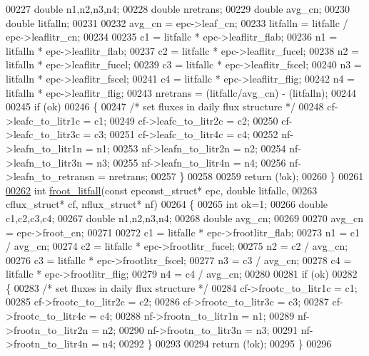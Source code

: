 \begin{DoxyCode}
00227     \textcolor{keywordtype}{double} n1,n2,n3,n4;
00228     \textcolor{keywordtype}{double} nretrans;
00229     \textcolor{keywordtype}{double} avg\_cn;
00230     \textcolor{keywordtype}{double} litfalln;
00231     
00232     avg\_cn = epc->leaf\_cn;
00233     litfalln = litfallc / epc->leaflitr\_cn;
00234     
00235     c1 = litfallc * epc->leaflitr\_flab;
00236     n1 = litfalln * epc->leaflitr\_flab;
00237     c2 = litfallc * epc->leaflitr\_fucel;
00238     n2 = litfalln * epc->leaflitr\_fucel; 
00239     c3 = litfallc * epc->leaflitr\_fscel;
00240     n3 = litfalln * epc->leaflitr\_fscel; 
00241     c4 = litfallc * epc->leaflitr\_flig;
00242     n4 = litfalln * epc->leaflitr\_flig; 
00243     nretrans = (litfallc/avg\_cn) - (litfalln);
00244     
00245     \textcolor{keywordflow}{if} (ok)
00246     \{
00247         \textcolor{comment}{/* set fluxes in daily flux structure */}
00248         cf->leafc\_to\_litr1c = c1;
00249         cf->leafc\_to\_litr2c = c2;
00250         cf->leafc\_to\_litr3c = c3;
00251         cf->leafc\_to\_litr4c = c4;
00252         nf->leafn\_to\_litr1n = n1;
00253         nf->leafn\_to\_litr2n = n2;
00254         nf->leafn\_to\_litr3n = n3;
00255         nf->leafn\_to\_litr4n = n4;
00256         nf->leafn\_to\_retransn = nretrans;
00257     \}
00258     
00259     \textcolor{keywordflow}{return} (!ok);
00260 \}
00261 
\hypertarget{phenology_8c_source_l00262}{}\hyperlink{phenology_8c_ac9d84f39b7db5a7498a0ac0f9edffd1f}{00262} \textcolor{keywordtype}{int} \hyperlink{phenology_8c_ac9d84f39b7db5a7498a0ac0f9edffd1f}{froot\_litfall}(\textcolor{keyword}{const} epconst\_struct* epc, \textcolor{keywordtype}{double} litfallc, 
00263 cflux\_struct* cf, nflux\_struct* nf)
00264 \{
00265     \textcolor{keywordtype}{int} ok=1;
00266     \textcolor{keywordtype}{double} c1,c2,c3,c4;
00267     \textcolor{keywordtype}{double} n1,n2,n3,n4;
00268     \textcolor{keywordtype}{double} avg\_cn;
00269     
00270     avg\_cn = epc->froot\_cn;
00271     
00272     c1 = litfallc * epc->frootlitr\_flab;
00273     n1 = c1 / avg\_cn;
00274     c2 = litfallc * epc->frootlitr\_fucel;
00275     n2 = c2 / avg\_cn;
00276     c3 = litfallc * epc->frootlitr\_fscel;
00277     n3 = c3 / avg\_cn;
00278     c4 = litfallc * epc->frootlitr\_flig;
00279     n4 = c4 / avg\_cn;
00280     
00281     \textcolor{keywordflow}{if} (ok)
00282     \{
00283         \textcolor{comment}{/* set fluxes in daily flux structure */}
00284         cf->frootc\_to\_litr1c = c1;
00285         cf->frootc\_to\_litr2c = c2;
00286         cf->frootc\_to\_litr3c = c3;
00287         cf->frootc\_to\_litr4c = c4;
00288         nf->frootn\_to\_litr1n = n1;
00289         nf->frootn\_to\_litr2n = n2;
00290         nf->frootn\_to\_litr3n = n3;
00291         nf->frootn\_to\_litr4n = n4;
00292     \}
00293     
00294     \textcolor{keywordflow}{return} (!ok);
00295 \}
00296 
\end{DoxyCode}
